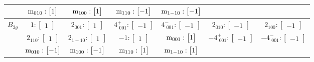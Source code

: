 \documentclass[fleqn,8pt,landscape]{jsarticle}
\begin{document}
\begin{longtable}{ccccccc}
& $ {\rm m}_{010}:\begin{bmatrix} 1 \end{bmatrix} $ & $ {\rm m}_{100}:\begin{bmatrix} 1 \end{bmatrix} $ & $ {\rm m}_{110}:\begin{bmatrix} -1 \end{bmatrix} $ & $ {\rm m}_{1-10}:\begin{bmatrix} -1 \end{bmatrix} $ & $  $ & $  $ \\ \hline
$ B_{2g} $ & $ 1:\begin{bmatrix} 1 \end{bmatrix} $ & $ 2{}_{001}:\begin{bmatrix} 1 \end{bmatrix} $ & $ 4^{+}_{\,\,001}:\begin{bmatrix} -1 \end{bmatrix} $ & $ 4^{-}_{\,\,001}:\begin{bmatrix} -1 \end{bmatrix} $ & $ 2{}_{010}:\begin{bmatrix} -1 \end{bmatrix} $ & $ 2{}_{100}:\begin{bmatrix} -1 \end{bmatrix} $ \\
& $ 2{}_{110}:\begin{bmatrix} 1 \end{bmatrix} $ & $ 2{}_{1-10}:\begin{bmatrix} 1 \end{bmatrix} $ & $ -1:\begin{bmatrix} 1 \end{bmatrix} $ & $ {\rm m}_{001}:\begin{bmatrix} 1 \end{bmatrix} $ & $ -4^{+}_{\,\,001}:\begin{bmatrix} -1 \end{bmatrix} $ & $ -4^{-}_{\,\,001}:\begin{bmatrix} -1 \end{bmatrix} $ \\
& $ {\rm m}_{010}:\begin{bmatrix} -1 \end{bmatrix} $ & $ {\rm m}_{100}:\begin{bmatrix} -1 \end{bmatrix} $ & $ {\rm m}_{110}:\begin{bmatrix} 1 \end{bmatrix} $ & $ {\rm m}_{1-10}:\begin{bmatrix} 1 \end{bmatrix} $ & $  $ & $  $ \\ \hline

\end{longtable}
\end{document}
